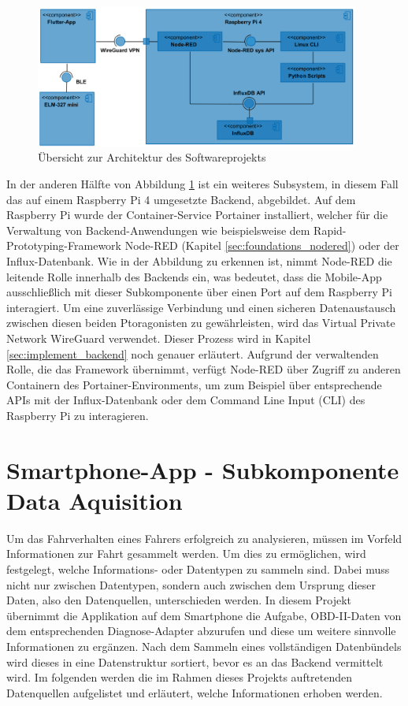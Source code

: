 \documentclass[oneside]{ausarbeitung}
\begin{document}
\begin{figure}[h!]
  \centering
  \includegraphics[width=0.95\textwidth]{images/component_diagramm_overview.png}
  \caption{Übersicht zur Architektur des Softwareprojekts}
  \label{fig:architecture}
\end{figure}

In der anderen Hälfte von Abbildung {\ref{fig:architecture}} ist ein weiteres Subsystem, in diesem Fall das auf einem Raspberry Pi 4 umgesetzte Backend, abgebildet. Auf dem Raspberry Pi wurde der Container-Service Portainer installiert, welcher für die Verwaltung von Backend-Anwendungen wie beispielsweise dem Rapid-Prototyping-Framework Node-RED (Kapitel \ref{sec:foundations_nodered}) oder der Influx-Datenbank.
Wie in der Abbildung zu erkennen ist, nimmt Node-RED die leitende Rolle innerhalb des Backends ein, was bedeutet, dass die Mobile-App ausschließlich mit dieser Subkomponente über einen Port auf dem Raspberry Pi interagiert. Um eine zuverlässige Verbindung und einen sicheren Datenaustausch zwischen diesen beiden Ptoragonisten zu gewährleisten,
wird das Virtual Private Network WireGuard verwendet. Dieser Prozess wird in Kapitel \ref{sec:implement_backend} noch genauer erläutert.
Aufgrund der verwaltenden Rolle, die das Framework übernimmt, verfügt Node-RED über Zugriff zu anderen Containern des Portainer-Environments, um zum Beispiel über entsprechende APIs mit der Influx-Datenbank oder dem Command Line Input (CLI) des Raspberry Pi zu interagieren.

\section{Smartphone-App - Subkomponente Data Aquisition}
\label{sec:implement_dataaquisition}

Um das Fahrverhalten eines Fahrers erfolgreich zu analysieren, müssen im Vorfeld Informationen zur Fahrt gesammelt werden. Um dies zu ermöglichen, wird festgelegt, welche Informations- oder Datentypen zu sammeln sind. Dabei muss nicht nur zwischen Datentypen, sondern auch zwischen dem Ursprung dieser Daten, also den Datenquellen, unterschieden werden. 
In diesem Projekt übernimmt die Applikation auf dem Smartphone die Aufgabe, OBD-II-Daten von dem entsprechenden Diagnose-Adapter abzurufen und diese um weitere sinnvolle Informationen zu ergänzen. Nach dem Sammeln eines vollständigen Datenbündels wird dieses in eine Datenstruktur sortiert, bevor es an das Backend vermittelt wird.
Im folgenden werden die im Rahmen dieses Projekts auftretenden Datenquellen aufgelistet und erläutert, welche Informationen erhoben werden.
\end{document}
